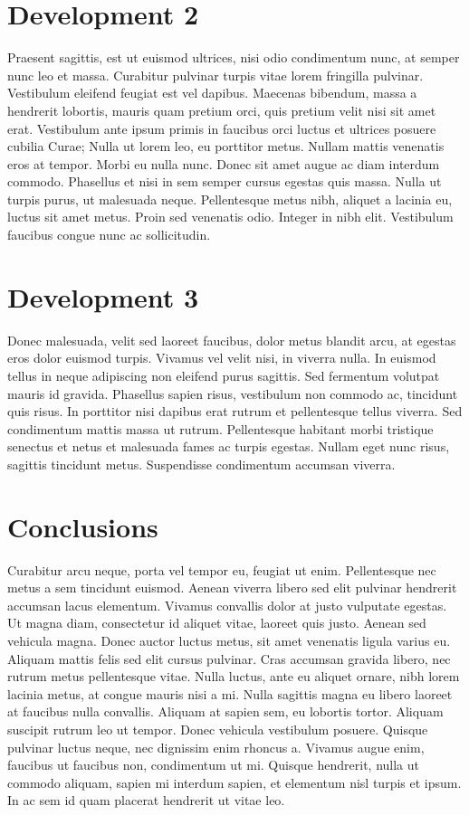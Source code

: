 \documentclass{genos-technical-report}
\begin{document}
\section{Development 2}
\label{sec:development-2}


Praesent sagittis, est ut euismod ultrices, nisi odio condimentum
nunc, at semper nunc leo et massa. Curabitur pulvinar turpis vitae
lorem fringilla pulvinar. Vestibulum eleifend feugiat est vel
dapibus. Maecenas bibendum, massa a hendrerit lobortis, mauris quam
pretium orci, quis pretium velit nisi sit amet erat. Vestibulum ante
ipsum primis in faucibus orci luctus et ultrices posuere cubilia
Curae; Nulla ut lorem leo, eu porttitor metus. Nullam mattis venenatis
eros at tempor. Morbi eu nulla nunc. Donec sit amet augue ac diam
interdum commodo. Phasellus et nisi in sem semper cursus egestas quis
massa. Nulla ut turpis purus, ut malesuada neque. Pellentesque metus
nibh, aliquet a lacinia eu, luctus sit amet metus. Proin sed venenatis
odio. Integer in nibh elit. Vestibulum faucibus congue nunc ac
sollicitudin.

\section{Development 3}
\label{sec:development-3}

Donec malesuada, velit sed laoreet faucibus, dolor metus blandit arcu,
at egestas eros dolor euismod turpis. Vivamus vel velit nisi, in
viverra nulla. In euismod tellus in neque adipiscing non eleifend
purus sagittis. Sed fermentum volutpat mauris id gravida. Phasellus
sapien risus, vestibulum non commodo ac, tincidunt quis risus. In
porttitor nisi dapibus erat rutrum et pellentesque tellus viverra. Sed
condimentum mattis massa ut rutrum. Pellentesque habitant morbi
tristique senectus et netus et malesuada fames ac turpis
egestas. Nullam eget nunc risus, sagittis tincidunt metus. Suspendisse
condimentum accumsan viverra.

\section{Conclusions}
\label{sec:conclusions}

Curabitur arcu neque, porta vel tempor eu, feugiat ut
enim. Pellentesque nec metus a sem tincidunt euismod. Aenean viverra
libero sed elit pulvinar hendrerit accumsan lacus elementum. Vivamus
convallis dolor at justo vulputate egestas. Ut magna diam, consectetur
id aliquet vitae, laoreet quis justo. Aenean sed vehicula magna. Donec
auctor luctus metus, sit amet venenatis ligula varius eu. Aliquam
mattis felis sed elit cursus pulvinar. Cras accumsan gravida libero,
nec rutrum metus pellentesque vitae. Nulla luctus, ante eu aliquet
ornare, nibh lorem lacinia metus, at congue mauris nisi a mi. Nulla
sagittis magna eu libero laoreet at faucibus nulla convallis. Aliquam
at sapien sem, eu lobortis tortor. Aliquam suscipit rutrum leo ut
tempor. Donec vehicula vestibulum posuere. Quisque pulvinar luctus
neque, nec dignissim enim rhoncus a. Vivamus augue enim, faucibus ut
faucibus non, condimentum ut mi. Quisque hendrerit, nulla ut commodo
aliquam, sapien mi interdum sapien, et elementum nisl turpis et
ipsum. In ac sem id quam placerat hendrerit ut vitae leo.

\nocite{sampaio.ea10:villa-lobos}



\end{document}
